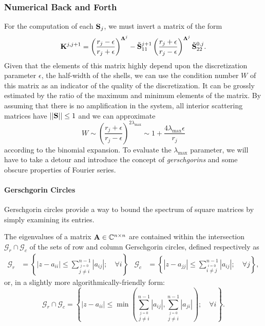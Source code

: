 \subsubsection{Numerical Back and Forth}
For the computation of each $\mathbf{S}_j$, we must invert
a matrix of the form 
  \begin{equation}
  \mathbf{K}^{j,j+1} = \left(\frac{r_j-\epsilon}{r_j+\epsilon}\right)^{\boldsymbol{\Lambda}^j}
		    -\tilde{\mathbf{S}}^{j+1}_{11}\left(\frac{r_j+\epsilon}{r_j-\epsilon}\right)^{\boldsymbol{\Lambda}^j}\tilde{\mathbf{S}}^{0,j}_{22}.
  \end{equation}
Given that the elements of this matrix highly depend upon the discretization
parameter $\epsilon$, the half-width of the shells, we can use the
condition number $W$ of this matrix as an indicator of the quality
of the discretization. It can be grossly estimated by the 
ratio of the maximum and minimum elements of the matrix. 
By assuming that there is no amplification in the system,
all interior scattering matrices have
$||\mathbf{S}||\leq1$ and we can approximate
  \begin{equation}
   W \sim \left(\frac{r_j+\epsilon}{r_j-\epsilon}\right)^{2\lambda_\text{max}}\sim 1 + \frac{4\lambda_\text{max}\epsilon}{r_j}
  \end{equation}
according to the binomial expansion.
To evaluate the $\lambda_\text{max}$ parameter, we will
have to take a detour and introduce the concept 
of \textit{\glspl{gerschgorin}} and some obscure
properties of Fourier series.

\paragraph{Gerschgorin Circles}
Gerschgorin circles provide a way to bound the spectrum 
of square matrices by simply examining its entries.

\begin{thm}
 The eigenvalues of a matrix $\mathbf{A}\in\mathbb{C}^{n\times n}$ are
 contained within the intersection $\mathcal{G}_r\cap\mathcal{G}_c$
 of the sets of row and column Gerschgorin circles, defined respectively as
  \begin{align*}
   \mathcal{G}_r	&= \left\{|z-a_{ii}| \leq \sum_{\stackrel{j=0}{j\neq i}}^{n-1} |a_{ij}|; \quad \forall i\right\}
  & \mathcal{G}_c	&= \left\{|z-a_{jj}| \leq \sum_{\stackrel{i=0}{i\neq j}}^{n-1} |a_{ij}|; \quad \forall j\right\},
  \end{align*}
 or, in a slightly more algorithmically-friendly form:
  \begin{equation}
   \mathcal{G}_r\cap\mathcal{G}_c = \left\{|z-a_{ii}| \leq \min\left(\sum_{\stackrel{j=0}{j\neq i}}^{n-1} |a_{ij}|,\sum_{\stackrel{j=0}{j\neq i}}^{n-1} |a_{ji}|\right)
				     ;\quad \forall i\right\}.
  \end{equation}
\end{thm}


